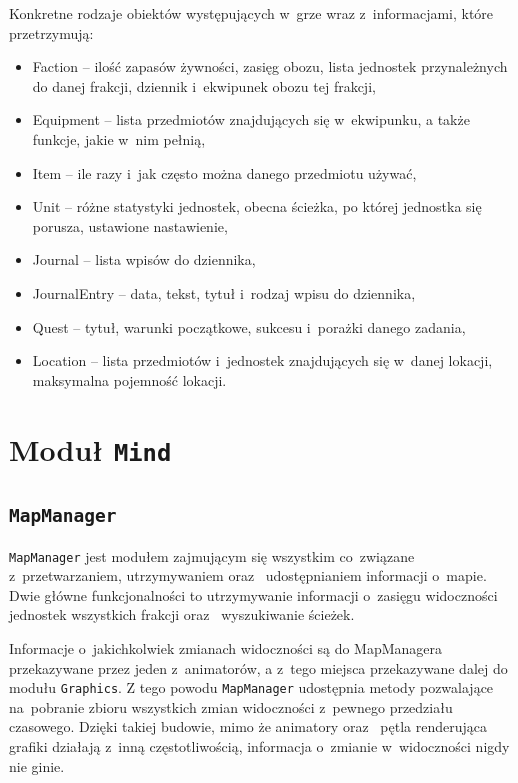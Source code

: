\documentclass[licencjacka]{pracamgr}
\begin{document}
    Konkretne rodzaje obiektów występujących w~grze wraz z~informacjami, które przetrzymują:
    \begin{itemize}
      \item Faction -- ilość zapasów żywności, zasięg obozu, lista jednostek przynależnych do danej
	frakcji, dziennik i~ekwipunek obozu tej frakcji,
      \item Equipment -- lista przedmiotów znajdujących się w~ekwipunku, a także funkcje, jakie w~nim pełnią,
      \item Item --  ile razy i~jak często można danego przedmiotu używać,
      \item Unit -- różne statystyki jednostek, obecna ścieżka, po której jednostka się porusza, ustawione nastawienie,
      \item Journal -- lista wpisów do dziennika,
      \item JournalEntry -- data, tekst, tytuł i~rodzaj wpisu do dziennika,
      \item Quest -- tytuł, warunki początkowe, sukcesu i~porażki danego zadania,
      \item Location -- lista przedmiotów i~jednostek znajdujących się w~danej lokacji, maksymalna pojemność lokacji.
    \end{itemize}

  \section{Moduł \texttt{Mind}}
    \subsection{\texttt{MapManager}}
      \texttt{MapManager} jest modułem zajmującym się wszystkim co~związane z~przetwarzaniem, utrzymywaniem oraz~ udostępnianiem
      informacji o~mapie. Dwie główne funkcjonalności to utrzymywanie informacji o~zasięgu widoczności jednostek wszystkich
      frakcji oraz~ wyszukiwanie ścieżek.

      Informacje o~jakichkolwiek zmianach widoczności są do MapManagera przekazywane przez jeden z~animatorów, a z~tego miejsca
      przekazywane dalej do modułu \texttt{Graphics}. Z tego powodu \texttt{MapManager} udostępnia metody pozwalające na~pobranie
      zbioru wszystkich zmian widoczności z~pewnego przedziału czasowego. Dzięki takiej budowie, mimo że animatory oraz~ pętla 
      renderująca grafiki działają z~inną częstotliwością, informacja o~zmianie w~widoczności nigdy nie ginie.
\end{document}
